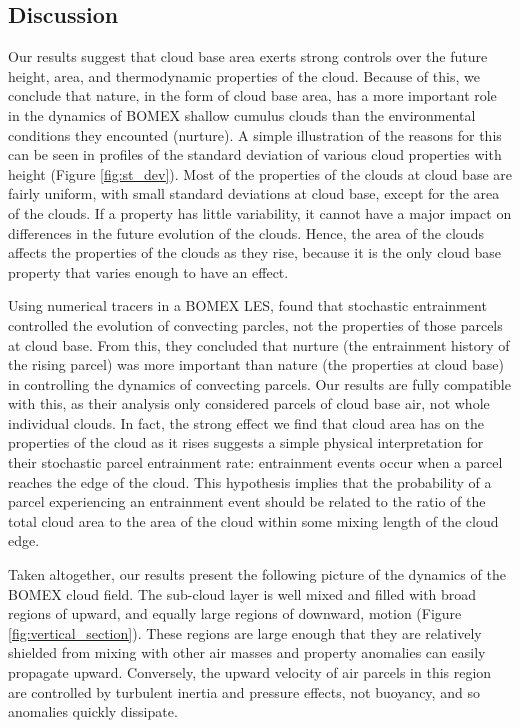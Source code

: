 \documentclass[acp]{copernicus}
\begin{document}
\subsection{Discussion}

Our results suggest that cloud base area exerts strong controls over the 
future height, area, and thermodynamic properties of the cloud.  Because of 
this, we conclude that nature, in the form of cloud base area, has a more 
important role in the dynamics of BOMEX shallow cumulus clouds than the 
environmental conditions they encounted (nurture).  A simple illustration of 
the reasons for this can be seen in profiles of the standard deviation of 
various cloud properties with height (Figure \ref{fig:st_dev}).  Most of the 
properties of the clouds at cloud base are fairly uniform, with small standard 
deviations at cloud base, except for the area of the clouds.  If a property has 
little variability, it cannot have a major impact on differences in the future 
evolution of the clouds.  Hence, the area of the clouds affects the properties 
of the clouds as they rise, because it is the only cloud base property that 
varies enough to have an effect.

Using numerical tracers in a BOMEX LES, \cite{Romps2010a} found that 
stochastic entrainment controlled the evolution of convecting parcles, not 
the properties of those parcels at cloud base.  From this, they concluded that 
nurture (the entrainment history of the rising parcel) was more important than 
nature (the properties at cloud base) in controlling the dynamics of convecting 
parcels.  Our results are fully compatible with this, as their analysis only 
considered parcels of cloud base air, not whole individual clouds.  In fact, 
the strong effect we find that cloud area has on the properties of the cloud as 
it rises suggests a simple physical interpretation for their stochastic parcel 
entrainment rate: entrainment events occur when a parcel reaches the edge of 
the cloud.  This hypothesis implies that the probability of a parcel 
experiencing an entrainment event should be related to the ratio of the total 
cloud area to the area of the cloud within some mixing length of the cloud 
edge.

Taken altogether, our results present the following picture of the dynamics of 
the BOMEX cloud field.  The sub-cloud layer is well mixed and filled with 
broad regions of upward, and equally large regions of downward, motion (Figure 
\ref{fig:vertical_section}).  These regions are large enough that they are 
relatively shielded from mixing with other air masses and property anomalies 
can easily propagate upward.  Conversely, the upward velocity of air parcels in 
this region are controlled by turbulent inertia and pressure effects, not 
buoyancy, and so anomalies quickly dissipate.
\end{document}
